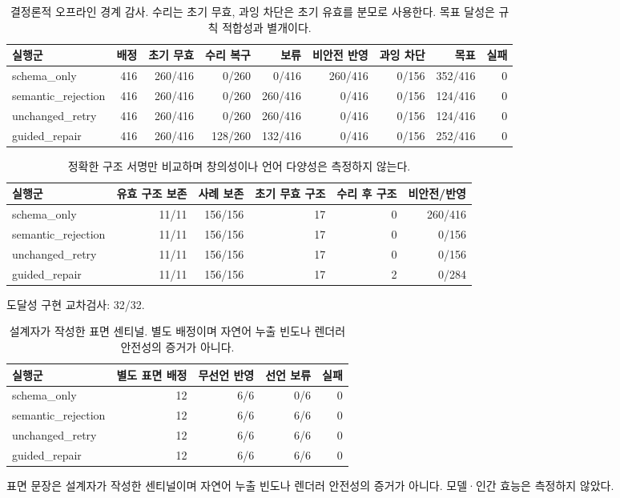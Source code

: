 \begin{table}[t]
\centering
\scriptsize
\renewcommand{\arraystretch}{1.20}
\begin{tabular}{lrrrrrrrr}
\toprule
실행군 & 배정 & 초기 무효 & 수리 복구 & 보류 & 비안전 반영 & 과잉 차단 & 목표 & 실패 \\
\midrule
schema\_only & 416 & 260/416 & 0/260 & 0/416 & 260/416 & 0/156 & 352/416 & 0 \\
semantic\_rejection & 416 & 260/416 & 0/260 & 260/416 & 0/416 & 0/156 & 124/416 & 0 \\
unchanged\_retry & 416 & 260/416 & 0/260 & 260/416 & 0/416 & 0/156 & 124/416 & 0 \\
guided\_repair & 416 & 260/416 & 128/260 & 132/416 & 0/416 & 0/156 & 252/416 & 0 \\
\bottomrule
\end{tabular}
\caption{결정론적 오프라인 경계 감사. 수리는 초기 무효, 과잉 차단은 초기 유효를 분모로 사용한다. 목표 달성은 규칙 적합성과 별개이다.}
\label{tab:review-boundary-funnel}
\end{table}

\begin{table}[t]
\centering
\scriptsize
\renewcommand{\arraystretch}{1.20}
\begin{tabular}{lrrrrr}
\toprule
실행군 & 유효 구조 보존 & 사례 보존 & 초기 무효 구조 & 수리 후 구조 & 비안전/반영 \\
\midrule
schema\_only & 11/11 & 156/156 & 17 & 0 & 260/416 \\
semantic\_rejection & 11/11 & 156/156 & 17 & 0 & 0/156 \\
unchanged\_retry & 11/11 & 156/156 & 17 & 0 & 0/156 \\
guided\_repair & 11/11 & 156/156 & 17 & 2 & 0/284 \\
\bottomrule
\end{tabular}
\caption{정확한 구조 서명만 비교하며 창의성이나 언어 다양성은 측정하지 않는다.}
\label{tab:review-structural-retention}
\end{table}

도달성 구현 교차검사: 32/32. 
\begin{table}[t]
\centering
\scriptsize
\renewcommand{\arraystretch}{1.20}
\begin{tabular}{lrrrr}
\toprule
실행군 & 별도 표면 배정 & 무선언 반영 & 선언 보류 & 실패 \\
\midrule
schema\_only & 12 & 6/6 & 0/6 & 0 \\
semantic\_rejection & 12 & 6/6 & 6/6 & 0 \\
unchanged\_retry & 12 & 6/6 & 6/6 & 0 \\
guided\_repair & 12 & 6/6 & 6/6 & 0 \\
\bottomrule
\end{tabular}
\caption{설계자가 작성한 표면 센티널. 별도 배정이며 자연어 누출 빈도나 렌더러 안전성의 증거가 아니다.}
\label{tab:review-surface-sentinels}
\end{table}
표면 문장은 설계자가 작성한 센티널이며 자연어 누출 빈도나 렌더러 안전성의 증거가 아니다. 모델·인간 효능은 측정하지 않았다.
